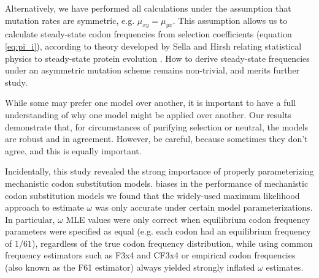 \documentclass[11pt]{article}
\begin{document}
Alternatively, we have performed all calculations under the assumption that mutation rates are symmetric, e.g. $\mu_{xy} = \mu_{yx}$. This assumption allows us to calculate steady-state codon frequencies from selection coefficients (equation \eqref{eq:pi_i}), according to theory developed by Sella and Hirsh relating statistical physics to steady-state protein evolution \cite{SellaHirsh2005}. How to derive steady-state frequencies under an asymmetric mutation scheme remains non-trivial, and merits further study. 


While some may prefer one model over another, it is important to have a full understanding of why one model might be applied over another. Our results demonstrate that, for circumstances of purifying selection or neutral, the models are robust and in agreement. However, be careful, because sometimes they don't agree, and this is equally important.

Incidentally, this study revealed the strong importance of properly parameterizing mechanistic codon substitution models. biases in the performance of mechanistic codon substitution models  we found that the widely-used maximum likelihood approach to estimate $\omega$ was only accurate under certain model parameterizations. In particular, $\omega$ MLE values were only correct when equilibrium codon frequency parameters were specified as equal (e.g. each codon had an equilibrium frequency of $1/61$), regardless of the true codon frequency distribution, while using common frequency estimators such as F3x4 \cite{MuseGaut1994} and CF3x4 \cite{Pond2010} or empirical codon frequencies (also known as the F61 estimator) always yielded strongly inflated $\omega$ estimates. 
\end{document}
